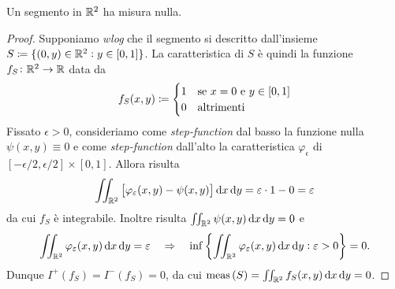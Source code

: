 \begin{prop}
	Un segmento in $ \mathbb{R}^2 $ ha misura nulla. 
\end{prop}
%
\begin{proof}
	Supponiamo \emph{wlog} che il segmento si descritto dall'insieme $ S \coloneqq \{(0, y) \in \mathbb{R}^2 : y \in [0, 1]\} $. La caratteristica di $ S $ è quindi la funzione $ f_S \colon \mathbb{R}^2 \to \mathbb{R} $ data da 
	\[
		f_S(x, y) \coloneqq 
		\begin{cases}
			1 & \text{se $ x = 0 $ e $ y \in [0, 1] $} \\
			0 & \text{altrimenti}
		\end{cases}
	\]
	Fissato $ \epsilon > 0 $, consideriamo come \emph{step-function} dal basso la funzione nulla $ \psi(x, y) \equiv 0 $ e come \emph{step-function} dall'alto la caratteristica $ \varphi_{\epsilon} $ di $ [-\epsilon/2, \epsilon/2] \times [0, 1] $. Allora risulta 
	\[
		\iint_{\R^2} \left[\varphi_{\epsilon}(x, y) - \psi(x, y)\right] \dif{x} \dif{y} = \epsilon \cdot 1 - 0 = \epsilon
	\]
	da cui $ f_S $ è integrabile. Inoltre risulta $ \iint_{\R^2} \psi(x, y) \dif{x} \dif{y} = 0 $ e 
	\[
		\iint_{\R^2} \varphi_{\epsilon}(x, y) \dif{x} \dif{y} = \epsilon \quad \Rightarrow \quad \inf{\left\{\iint_{\R^2} \varphi_{\epsilon}(x, y) \dif{x} \dif{y} : \epsilon > 0\right\}} = 0.
	\] 
	Dunque $ I^+(f_S) = I^-(f_S) = 0 $, da cui $ \meas{(S)} = \iint_{\R^2} f_S(x, y) \dif{x} \dif{y} = 0 $. 
\end{proof}

